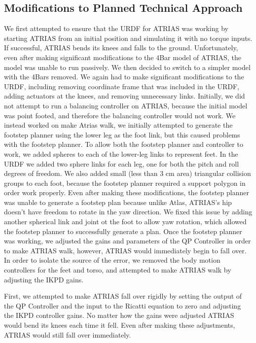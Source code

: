 \documentclass[letterpaper, 10 pt, conference]{ieeeconf}  %
\begin{document}
\subsection{Modifications to Planned Technical Approach}

We first attempted to ensure that the URDF for ATRIAS was working by starting ATRIAS from an initial position and simulating it with no torque inputs. If successful, ATRIAS bends its knees and falls to the ground. Unfortunately, even after making significant modifications to the 4Bar model of ATRIAS, the model was unable to run passively. We then decided to switch to a simpler model with the 4Bars removed. We again had to make significant modifications to the URDF, including removing coordinate frame that was included in the URDF, adding actuators at the knees, and removing unnecessary links. Initially, we did not attempt to run a balancing controller on ATRIAS, because the initial model was point footed, and therefore the balancing controller would not work. We instead worked on make Atrias walk, we initially attempted to generate the footstep planner using the lower leg as the foot link, but this caused problems with the footstep planner. To allow both the footstep planner and controller to work, we added spheres to each of the lower-leg links to represent feet. In the URDF we added two sphere links for each leg, one for both the pitch and roll degrees of freedom. We also added small (less than 3 cm area) triangular collision groups to each foot, because the footstep planner required a support polygon in order work properly. Even after making these modifications, the footstep planner was unable to generate a footstep plan because unlike Atlas, ATRIAS’s hip doesn’t have freedom to rotate in the yaw direction. We fixed this issue by adding another spherical link and joint ot the foot to allow yaw rotation, which allowed the footstep planner to successfully generate a plan. 
Once the footstep planner was working, we adjusted the gains and parameters of the QP Controller in order to make ATRIAS walk, however, ATRIAS would immediately begin to fall over. In order to isolate the source of the error, we removed the body motion controllers for the feet and torso, and attempted to make ATRIAS walk by adjusting the IKPD gains.

First, we attempted to make ATRIAS  fall over rigidly by setting the output of the QP Controller and the input to the Ricatti equation to zero and adjusting the IKPD controller gains. No matter how the gains were adjusted ATRIAS would bend its knees each time it fell. Even after making these adjustments, ATRIAS would still fall over immediately.
\end{document}

